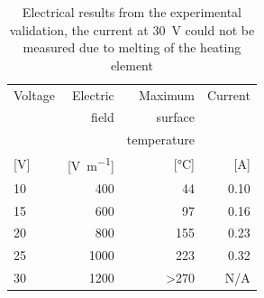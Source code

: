 \documentclass[11pt,review,times]{elsarticle}
\begin{document}
\begin{table}[htb]
\centering
\begin{tabular}{@{}lrrr@{}}
\toprule
Voltage 				& Electric							& Maximum  				& Current\\ 
 						& field								& surface 				& \\ 
 						& 										& temperature 			& \\
{[}\si{\volt}{]} 	& {[}\si{\volt\per\metre}{]} 	& {[}\si{\celsius}{]}	& {[}\si{\ampere}{]}\\ \midrule
10 						& 400									& 44 						& 0.10 \\
15						& 600									& 97 						& 0.16 \\
20 						& 800									& 155 						& 0.23 \\
25 						& 1000									& 223 						& 0.32 \\
30 						& 1200									& \textgreater 270 	& N/A \\ \bottomrule
\end{tabular}%
\caption{Electrical results from the experimental validation, the current at \SI{30}{\volt} could not be measured due to melting of the heating element}
\label{tab:results_lab}
\end{table}

\begin{table}[H]
\centering
{}
\caption{LSS and fractography analysis reported as average values $\pm$ standard deviation \cite{Brassard2018_figshare_article1}}
\label{tab:SLS_and_fractography_results}
\end{table}


\FloatBarrier
\clearpage



\end{document}
